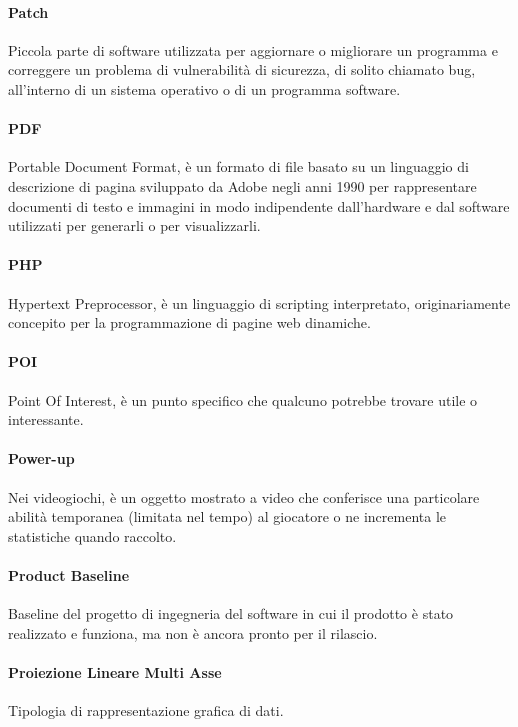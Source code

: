 \documentclass[]{article}
\begin{document}
	\paragraph*{Patch}
	Piccola parte di software utilizzata per aggiornare o migliorare un programma e correggere un problema di vulnerabilità di sicurezza, di solito chiamato bug, all'interno di un sistema operativo o di un programma software.

	\paragraph*{PDF}
	Portable Document Format, è un formato di file basato su un linguaggio di descrizione di pagina sviluppato da Adobe negli anni 1990 per rappresentare documenti di testo e immagini in modo indipendente dall'hardware e dal software utilizzati per generarli o per visualizzarli.

	\paragraph*{PHP}
	Hypertext Preprocessor, è un linguaggio di scripting interpretato, originariamente concepito per la programmazione di pagine web dinamiche.

	\paragraph*{POI}
	Point Of Interest, è un punto specifico che qualcuno potrebbe trovare utile o interessante.

    \paragraph*{Power-up}
    Nei videogiochi, è un oggetto mostrato a video che conferisce una particolare abilità temporanea (limitata nel tempo) al giocatore o ne incrementa le statistiche quando raccolto.

	\paragraph*{Product Baseline}
	Baseline del progetto di ingegneria del software in cui il prodotto è stato realizzato e funziona, ma non è ancora pronto per il rilascio.

	\paragraph*{Proiezione Lineare Multi Asse}
	Tipologia di rappresentazione grafica di dati.
\end{document}
